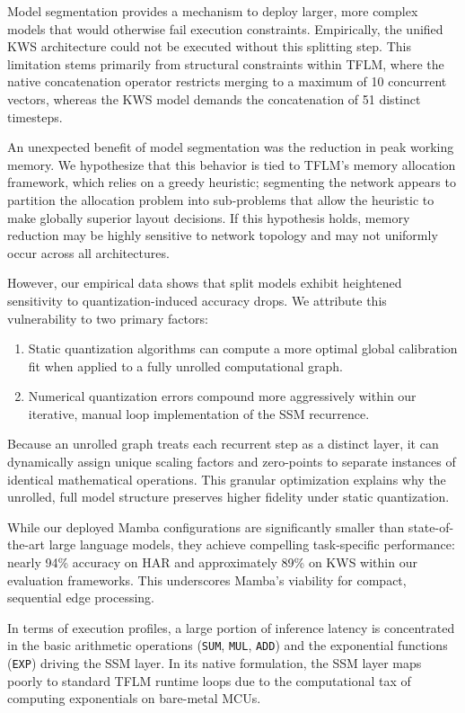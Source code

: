 Model segmentation provides a mechanism to deploy larger, more complex models that would otherwise fail execution constraints. Empirically, the unified KWS architecture could not be executed without this splitting step. This limitation stems primarily from structural constraints within TFLM, where the native concatenation operator restricts merging to a maximum of 10 concurrent vectors, whereas the KWS model demands the concatenation of 51 distinct timesteps.

An unexpected benefit of model segmentation was the reduction in peak working memory. We hypothesize that this behavior is tied to TFLM's memory allocation framework, which relies on a greedy heuristic; segmenting the network appears to partition the allocation problem into sub-problems that allow the heuristic to make globally superior layout decisions. If this hypothesis holds, memory reduction may be highly sensitive to network topology and may not uniformly occur across all architectures.

However, our empirical data shows that split models exhibit heightened sensitivity to quantization-induced accuracy drops. We attribute this vulnerability to two primary factors:
\begin{enumerate}
  \item Static quantization algorithms can compute a more optimal global calibration fit when applied to a fully unrolled computational graph.
  \item Numerical quantization errors compound more aggressively within our iterative, manual loop implementation of the SSM recurrence.
\end{enumerate}
Because an unrolled graph treats each recurrent step as a distinct layer, it can dynamically assign unique scaling factors and zero-points to separate instances of identical mathematical operations. This granular optimization explains why the unrolled, full model structure preserves higher fidelity under static quantization.

While our deployed Mamba configurations are significantly smaller than state-of-the-art large language models, they achieve compelling task-specific performance: nearly 94\% accuracy on HAR and approximately 89\% on KWS within our evaluation frameworks. This underscores Mamba's viability for compact, sequential edge processing.

In terms of execution profiles, a large portion of inference latency is concentrated in the basic arithmetic operations (\texttt{SUM}, \texttt{MUL}, \texttt{ADD}) and the exponential functions (\texttt{EXP}) driving the SSM layer. In its native formulation, the SSM layer maps poorly to standard TFLM runtime loops due to the computational tax of computing exponentials on bare-metal MCUs.

